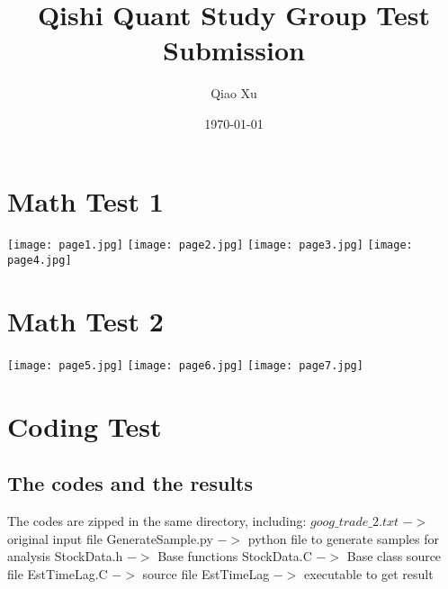 \documentclass[12pt,a4paper]{article}
\title{
Qishi Quant Study Group Test Submission}
\author{Qiao Xu}
\date{\today}
\begin{document}
\maketitle
\section{Math Test 1}
\texttt{[image: page1.jpg]}
\newpage
\texttt{[image: page2.jpg]}
\newpage
\texttt{[image: page3.jpg]}
\newpage
\texttt{[image: page4.jpg]}
\newpage
\section{Math Test 2}
\texttt{[image: page5.jpg]}
\newpage
\texttt{[image: page6.jpg]}
\newpage
\texttt{[image: page7.jpg]}
\newpage
\section{Coding Test}
\subsection{The codes and the results}
The codes are zipped in the same directory, including: \newline
$goog\_trade\_2.txt$  $->$ original input file \newline
GenerateSample.py  $->$ python file to generate samples for analysis \newline
StockData.h  $->$ Base functions \newline
StockData.C  $->$ Base class source file \newline
EstTimeLag.C $->$ source file \newline
EstTimeLag  $->$  executable to get result \newline
\end{document}
